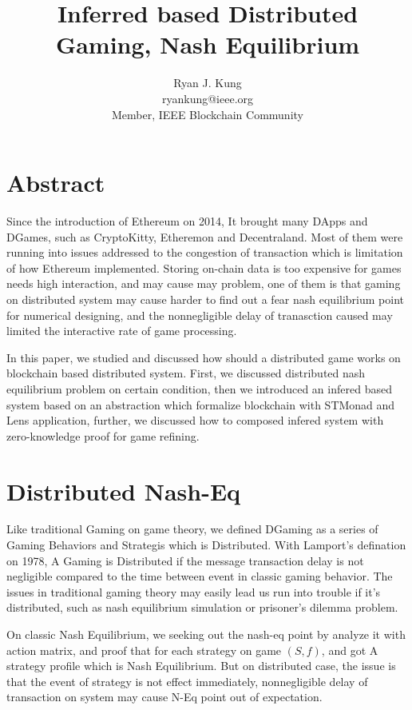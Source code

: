\documentclass[twocolumn]{article}
\author{Ryan J. Kung \\ryankung@ieee.org\\Member, IEEE Blockchain Community }
\title{Inferred based Distributed Gaming, Nash Equilibrium}
\begin{document}
\maketitle
\section{Abstract}

Since the introduction of Ethereum on 2014\cite{ethereum}, It brought many DApps and DGames, such as CryptoKitty, Etheremon and Decentraland. Most of them were running into issues addressed to the congestion of transaction which is limitation of how Ethereum implemented. Storing on-chain data is too expensive for games needs high interaction, and may cause may problem, one of them is that gaming on distributed system may cause harder to find out a fear nash equilibrium point for numerical designing, and the nonnegligible delay of tranasction caused may limited the interactive rate of game processing.

In this paper, we studied and discussed how should a distributed game works on blockchain based distributed system. First, we discussed distributed nash equilibrium problem on certain condition, then we introduced an infered based system based on an abstraction which formalize blockchain with STMonad and Lens application, further, we discussed how to composed infered system with zero-knowledge proof for game refining.

\section{Distributed Nash-Eq}

Like traditional Gaming on game theory, we defined DGaming as a series of Gaming Behaviors and Strategis which is Distributed. With Lamport's defination on 1978\cite{time-clocks-ordering-events-distributed-system}, A Gaming is Distributed if the message transaction delay is not negligible compared to the time between event in classic gaming behavior. The issues in traditional gaming theory may easily lead us run into trouble if it's distributed, such as nash equilibrium simulation or prisoner's dilemma problem.

On classic Nash Equilibrium, we seeking out the nash-eq point by analyze it with action matrix, and proof that for each strategy on game $(S, f)$, and got A strategy profile which is Nash Equilibrium. But on distributed case, the issue is that the event of strategy is not effect immediately, nonnegligible delay of transaction on system may cause N-Eq point out of expectation.
\end{document}
